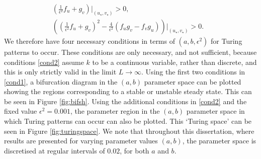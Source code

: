 \begin{equation}\label{cond2}
    \begin{split}
    \left(\frac{1}{\epsilon^2}f_u+g_v\right)\bigg|_{(u_\star,v_\star)}>0,&\\
    \left(\left(\frac{1}{\epsilon^2}f_u+g_v\right)^2-\frac{4}{\epsilon^2}(f_ug_v-f_vg_u)\right)\bigg|_{(u_\star,v_\star)}>0.
\end{split}
\end{equation}
We therefore have four necessary conditions in terms of $(a,b,\epsilon^2)$ for Turing patterns to occur. These conditions are only necessary, and not sufficient, because conditions \eqref{cond2} assume $k$ to be a continuous variable, rather than discrete, and this is only strictly valid in the limit $L\to\infty$. Using the first two conditions in \eqref{cond1}, a bifurcation diagram in the $(a,b)$ parameter space can be plotted showing the regions corresponding to a stable or unstable steady state. This can be seen in Figure \ref{fig:bifsh}. Using the additional conditions in \eqref{cond2} and the fixed value $\epsilon^2=0.001$, the parameter region in the $(a,b)$ parameter space in which Turing patterns can occur can also be plotted. This `Turing space' can be seen in Figure \ref{fig:turingspace}. We note that throughout this dissertation, where results are presented for varying parameter values $(a,b)$, the parameter space is discretised at regular intervals of $0.02$, for both $a$ and $b$.

